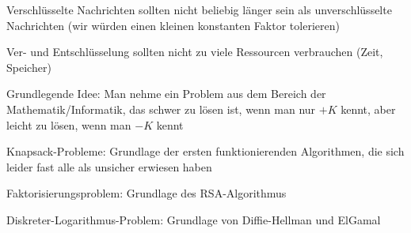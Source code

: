 \documentclass[a4paper]{article}
\begin{document}
\begin{multicols}{3}
\begin{itemize*}
\begin{itemize*}
\begin{itemize*}
                        \item Verschlüsselte Nachrichten sollten nicht beliebig länger sein als unverschlüsselte Nachrichten (wir würden einen kleinen konstanten Faktor tolerieren)
                        \item Ver- und Entschlüsselung sollten nicht zu viele Ressourcen verbrauchen (Zeit, Speicher)
                  \end{itemize*}
                  \item Grundlegende Idee: Man nehme ein Problem aus dem Bereich der Mathematik/Informatik, das schwer zu lösen ist, wenn man nur $+K$ kennt, aber leicht zu lösen, wenn man $-K$ kennt
                  \begin{itemize*}
                        \item Knapsack-Probleme: Grundlage der ersten funktionierenden Algorithmen, die sich leider fast alle als unsicher erwiesen haben
                        \item Faktorisierungsproblem: Grundlage des RSA-Algorithmus
                        \item Diskreter-Logarithmus-Problem: Grundlage von Diffie-Hellman und ElGamal
                  \end{itemize*}
            \end{itemize*}
      \end{itemize*}


\end{multicols}
\end{document}
